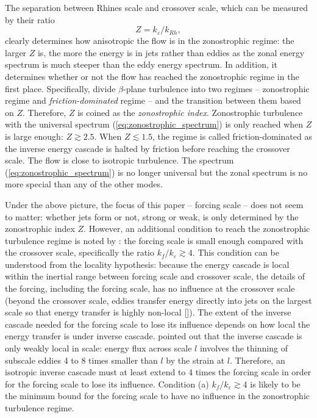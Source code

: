 \documentclass{ametsoc}
\begin{document}
The separation between Rhines scale and crossover scale, which can be measured by their ratio
\begin{equation}
Z=k_{\varepsilon}/k_{Rh},\label{eq:zonostrophic_index_def}
\end{equation}
clearly determines how anisotropic the flow is in the zonostrophic
regime: the larger $Z$ is, the more the energy is in jets rather than
eddies as the zonal energy spectrum is much steeper than the eddy energy spectrum. 
In addition, it determines whether or not the flow has reached
the zonostrophic regime in the first place. Specifically, \citet{Galperin2010}
divide $\beta$-plane turbulence into two regimes -- zonostrophic
regime and \textit{friction-dominated} regime -- and the transition
between them based on $Z$. Therefore, $Z$ is coined as the \textit{zonostrophic
index}. Zonostrophic turbulence with the universal spectrum (\ref{eq:zonostrophic_spectrum})
is only reached when $Z$ is large enough: $Z\gtrsim2.5$. When $Z\lesssim1.5$,
the regime is called friction-dominated as the inverse energy cascade
is halted by friction before reaching the crossover scale. The flow
is close to isotropic turbulence. The spectrum (\ref{eq:zonostrophic_spectrum})
is no longer universal but the zonal spectrum is no more special than any of the other modes.

Under the above picture, the focus of this paper -- forcing scale --
does not seem to matter: whether jets form or not, strong or weak,
is only determined by the zonostrophic index $Z$. However,
an additional condition to reach the zonostrophic turbulence regime 
is noted by \citet{Sukoriansky2007}: the forcing scale is small
enough compared with the crossover scale, specifically the ratio $k_{f}/k_{\varepsilon}\apprge4$.
This condition can be understood from the locality hypothesis: because the
energy cascade is local within the inertial range between forcing scale
and crossover scale, the details of the forcing, including the forcing scale,
has no influence at the crossover scale (beyond the crossover scale, eddies
transfer energy directly into jets on the largest scale so that energy
transfer is highly non-local {[}\citealt{Manz2009}{]}). 
The extent of the inverse cascade needed for the forcing scale to lose
its influence depends on how local the energy transfer is under inverse
cascade. \citet{Chen2006} pointed out that the inverse cascade is
only weakly local in scale: energy flux across scale $l$ involves
the thinning of subscale eddies 4 to 8 times smaller than $l$ by
the strain at $l$. Therefore, an isotropic inverse cascade must at
least extend to 4 times the forcing scale in order for the forcing
scale to lose its influence. Condition (a) $k_{f}/k_{\varepsilon}\apprge4$
is likely to be the minimum bound for the forcing scale to have no
influence in the zonostrophic turbulence regime.
\end{document}
